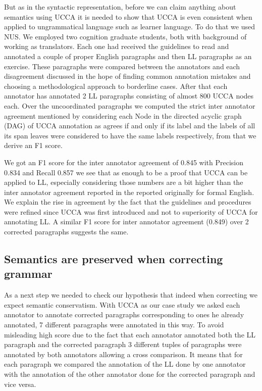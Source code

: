 \documentclass[english]{article}
\begin{document}
But as in the syntactic representation, before we can claim anything
about semantics using UCCA it is needed to show that UCCA is even
consistent when applied to ungrammatical language such as learner
language. To do that we used NUS\cite{dahlmeier2013building}. We employed two cognition graduate students, both
with background of working as translators. Each
one had received the guidelines to read and annotated a couple of
proper English paragraphs and then LL paragraphs as
an exercise. These paragraphs were compared between the annotators
and each disagreement discussed in the hope of finding common annotation
mistakes and choosing a methodological approach to borderline cases.
After that each annotator has annotated 2 LL paragraphs
consisting of almost 800 UCCA nodes each. Over the uncoordinated paragraphs
we computed the strict inter annotator agreement mentioned by \cite{abend2013universal}
considering each Node in the directed acyclic graph (DAG) of UCCA
annotation as agrees if and only if its label and the labels of all
its span leaves were considered to have the same labels respectively,
from that we derive an F1 score. 

We got an F1 score for the inter annotator agreement of 0.845 with
Precision 0.834 and Recall 0.857 we see that as enough to be a proof
that UCCA can be applied to LL, especially considering those numbers
are a bit higher than the inter annotator agreement reported in the
reported originally for formal English\cite{abend2013universal}.
We explain the rise in agreement by the fact that the guidelines and
procedures were refined since UCCA was first introduced and not to
superiority of UCCA for annotating LL. A similar F1
score for inter annotator agreement (0.849) over 2 corrected paragraphs
suggests the same.

\subsection{Semantics are preserved when correcting grammar}


As a next step we needed to check our hypothesis that indeed when correcting we expect semantic conservatism. With UCCA as our case study we asked each annotator to annotate corrected paragraphs corresponding
to ones he already annotated, 7 different paragraphs were annotated
in this way. To avoid misleading high score due to the fact that each
annotator annotated both the LL paragraph and the corrected
paragraph 3 different tuples of paragraphs were annotated by both
annotators allowing a cross comparison. It means that for each paragraph
we compared the annotation of the LL done by one annotator
with the annotation of the other annotator done for the corrected
paragraph and vice versa. 
\end{document}
